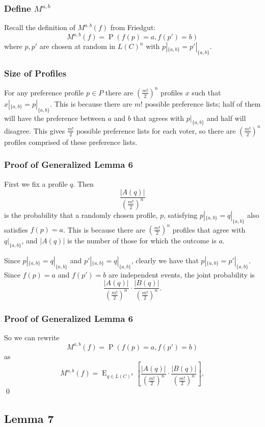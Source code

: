 \documentclass[aspectratio=169]{beamer}
\DeclareMathOperator{\probability}{P}
\DeclareMathOperator{\expectedvalue}{E}
\begin{document}
		\begin{frame}
			\frametitle{Define $M^{a,b}$}

			Recall the definition of $M^{a,b}(f)$ from Friedgut:
			\[
				M^{a,b}(f) = \probability(f(p) = a, f(p') = b)
			\]
			where $p, p'$ are chosen at random in $L(C)^n$ with $p|_{\{a,b\}} = p'|_{\{a,b\}}$.
		\end{frame}

		\begin{frame}
			\frametitle{Size of Profiles}

			For any preference profile $p \in P$ there are $(\frac{m!}{2})^n$ profiles $x$ such that $x|_{\{a, b\}} = p|_{\{a, b\}}$. This is because there are $m!$ possible preference lists; half of them will have the preference between $a$ and $b$ that agrees with $p|_{\{a, b\}}$ and half will disagree. This gives $\frac{m!}{2}$ possible preference lists for each voter, so there are $(\frac{m!}{2})^n$ profiles comprised of these preference lists.
		\end{frame}

		\begin{frame}
			\frametitle{Proof of Generalized Lemma 6}

			First we fix a profile $q$. Then
			\[
				\frac{|A(q)|}{\left(\frac{m!}{2}\right)^n}
			\]
			is the probability that a randomly chosen profile, $p$, satisfying $p|_{\{a,b\}} = q|_{\{a,b\}}$ also satisfies $f(p) = a$. This is because there are $(\frac{m!}{2})^n$ profiles that agree with $q|_{\{a,b\}}$, and $|A(q)|$ is the number of those for which the outcome is $a$.

			Since $p|_{\{a,b\}} = q|_{\{a,b\}}$ and $p'|_{\{a,b\}} = q|_{\{a,b\}}$, clearly we have that $p|_{\{a,b\}} = p'|_{\{a,b\}}$. Since $f(p) = a$ and $f(p') = b$ are independent events, the joint probability is
			\[
				\frac{|A(q)|}{\left(\frac{m!}{2}\right)^n} \cdot \frac{|B(q)|}{\left(\frac{m!}{2}\right)^n}.
			\]
		\end{frame}

		\begin{frame}
			\frametitle{Proof of Generalized Lemma 6}

			So we can rewrite
			\[
				M^{a,b}(f) = \probability(f(p) = a, f(p') = b)
			\]
			as
			\[
				M^{a,b}(f) = \expectedvalue_{q \in L(C)^n} \left[ \frac{|A(q)|}{\left(\frac{m!}{2}\right)^n} \cdot \frac{|B(q)|}{\left(\frac{m!}{2}\right)^n} \right],
			\]
			\qed
		\end{frame}


	\subsection{Lemma 7}
\end{document}
